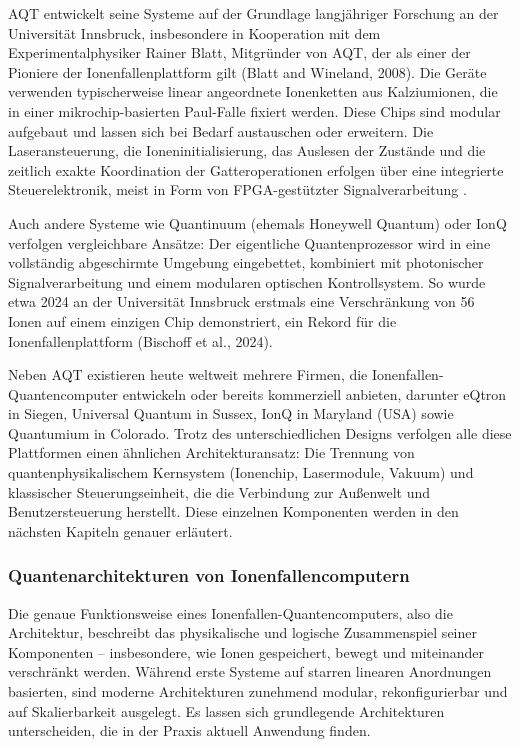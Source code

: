 AQT entwickelt seine Systeme auf der Grundlage langjähriger Forschung an der Universität Innsbruck, insbesondere in Kooperation mit dem Experimentalphysiker Rainer Blatt, Mitgründer von AQT, der als einer der Pioniere der Ionenfallenplattform gilt (Blatt and Wineland, 2008). Die Geräte verwenden typischerweise linear angeordnete Ionenketten aus Kalziumionen, die in einer mikrochip-basierten Paul-Falle fixiert werden. Diese Chips sind modular aufgebaut und lassen sich bei Bedarf austauschen oder erweitern. Die Laseransteuerung, die Ioneninitialisierung, das Auslesen der Zustände und die zeitlich exakte Koordination der Gatteroperationen erfolgen über eine integrierte Steuerelektronik, meist in Form von FPGA-gestützter Signalverarbeitung .

Auch andere Systeme wie Quantinuum (ehemals Honeywell Quantum) oder IonQ verfolgen vergleichbare Ansätze: Der eigentliche Quantenprozessor wird in eine vollständig abgeschirmte Umgebung eingebettet, kombiniert mit photonischer Signalverarbeitung und einem modularen optischen Kontrollsystem. So wurde etwa 2024 an der Universität Innsbruck erstmals eine Verschränkung von 56 Ionen auf einem einzigen Chip demonstriert, ein Rekord für die Ionenfallenplattform (Bischoff et al., 2024). 

Neben AQT existieren heute weltweit mehrere Firmen, die Ionenfallen-Quantencomputer entwickeln oder bereits kommerziell anbieten, darunter eQtron in Siegen, Universal Quantum in Sussex, IonQ in Maryland (USA) sowie Quantumium in Colorado. 
Trotz des unterschiedlichen Designs verfolgen alle diese Plattformen einen ähnlichen Architekturansatz: Die Trennung von quantenphysikalischem Kernsystem (Ionenchip, Lasermodule, Vakuum) und klassischer Steuerungseinheit, die die Verbindung zur Außenwelt und Benutzersteuerung herstellt. Diese einzelnen Komponenten werden in den nächsten Kapiteln genauer erläutert.

\subsubsection{Quantenarchitekturen von Ionenfallencomputern}
Die genaue Funktionsweise eines Ionenfallen-Quantencomputers, also die Architektur, beschreibt das physikalische und logische Zusammenspiel seiner Komponenten – insbesondere, wie Ionen gespeichert, bewegt und miteinander verschränkt werden. Während erste Systeme auf starren linearen Anordnungen basierten, sind moderne Architekturen zunehmend modular, rekonfigurierbar und auf Skalierbarkeit ausgelegt. Es lassen sich grundlegende Architekturen unterscheiden, die in der Praxis aktuell Anwendung finden.
\\\\
